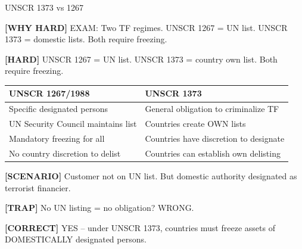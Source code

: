 \documentclass[6pt,aspectratio=169,fontsize=5pt]{beamer}
\renewcommand{\tiny}{\fontsize{3.5pt}{4.5pt}\selectfont}
\renewcommand{\normalsize}{\fontsize{7.5pt}{8.5pt}\selectfont}
\newcommand{\trap}[1]{%
	\begin{block}{\textcolor{redtrap}{\textbf{[TRAP]}}}
		\textcolor{redtrap}{\tiny #1}
	\end{block}
}
\newcommand{\scenario}[1]{%
	\begin{block}{\textbf{[SCENARIO]}}
		\tiny #1
	\end{block}
}
\newcommand{\correct}[1]{%
	\begin{block}{\textcolor{greencorrect}{\textbf{[CORRECT]}}}
		\textcolor{greencorrect}{\tiny #1}
	\end{block}
}
\newcommand{\hard}[1]{%
	\begin{block}{\textcolor{hardcolor}{\textbf{[HARD]}}}
		\textcolor{hardcolor}{\tiny #1}
	\end{block}
}
\newcommand{\hardexplain}[1]{%
	\begin{block}{\textcolor{orangehard}{\textbf{[WHY HARD]}}}
		\textcolor{orangehard}{\tiny #1}
	\end{block}
}
\begin{document}
	\begin{frame}{\normalsize UNSCR 1373 vs 1267}
		
		\hardexplain{EXAM: Two TF regimes. UNSCR 1267 = UN list. UNSCR 1373 = domestic lists. Both require freezing.}
		
		\hard{UNSCR 1267 = UN list. UNSCR 1373 = country own list. Both require freezing.}
		
		\begin{table}
			\begin{tabular}{|p{4cm}|p{4cm}|}
				\hline
				\textbf{UNSCR 1267/1988} & \textbf{UNSCR 1373} \\
				\hline
				Specific designated persons & General obligation to criminalize TF \\
				\hline
				UN Security Council maintains list & Countries create OWN lists \\
				\hline
				Mandatory freezing for all & Countries have discretion to designate \\
				\hline
				No country discretion to delist & Countries can establish own delisting \\
				\hline
			\end{tabular}
		\end{table}
		
		\scenario{Customer not on UN list. But domestic authority designated as terrorist financier.}
		
		\trap{No UN listing = no obligation? WRONG.}
		
		\correct{YES -- under UNSCR 1373, countries must freeze assets of DOMESTICALLY designated persons.}
	\end{frame}
	
\end{document}
